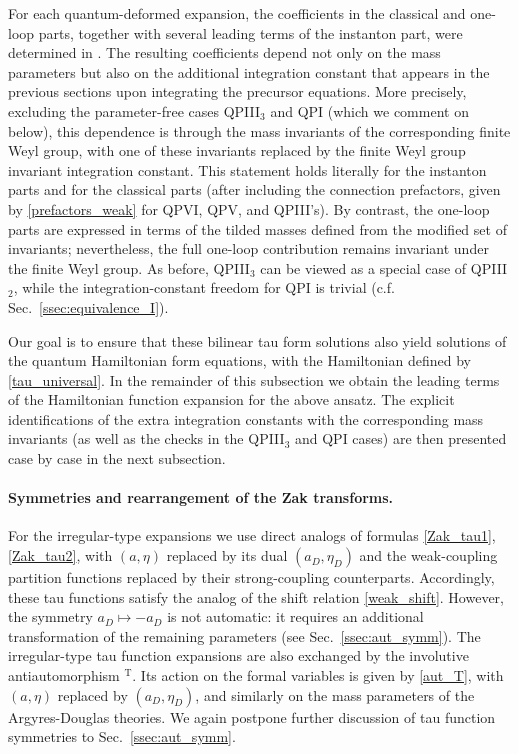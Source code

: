 \documentclass[12pt,a4paper]{article}
\numberwithin{equation}{section}
\newcommand{\D}{\scriptscriptstyle{D}}
\begin{document}
For each quantum-deformed expansion, the coefficients in the classical and one-loop parts, together with several leading terms of the instanton part, were determined in \cite[Sec.~4]{BST25}. The resulting coefficients depend not only on the mass parameters but also on the additional integration constant that appears in the previous sections upon integrating the precursor equations. More precisely, excluding the parameter-free cases QPIII$_3$ and QPI (which we comment on below), this dependence is through the mass invariants of the corresponding finite Weyl group, with one of these invariants replaced by the finite Weyl group invariant integration constant. This statement holds literally for the instanton parts and for the classical parts (after including the connection prefactors, given by \eqref{prefactors_weak} for QPVI, QPV, and QPIII's). By contrast, the one-loop parts are expressed in terms of the tilded masses defined from the modified set of invariants; nevertheless, the full one-loop contribution remains invariant under the finite Weyl group. As before, QPIII$_3$ can be viewed as a special case of QPIII$_2$, while the integration-constant freedom for QPI is trivial (c.f. Sec.~\ref{ssec:equivalence_I}).
 
Our goal is to ensure that these bilinear tau form solutions also yield solutions of the quantum Hamiltonian form equations, with the Hamiltonian defined by \eqref{tau_universal}. In the remainder of this subsection we obtain the leading terms of the Hamiltonian function expansion for the above ansatz. The explicit identifications of the extra integration constants with the corresponding mass invariants (as well as the checks in the QPIII$_3$ and QPI cases) are then presented case by case in the next subsection.

\paragraph{Symmetries and rearrangement of the Zak transforms.}
For the irregular-type expansions we use direct analogs of formulas \eqref{Zak_tau1}, \eqref{Zak_tau2}, with $(a,\eta)$ replaced by its dual $(a_{\D},\eta_{\D})$ and the weak-coupling partition functions replaced by their strong-coupling counterparts. Accordingly, these tau functions satisfy the analog of the shift relation
\eqref{weak_shift}. However, the symmetry $a_{\D}\mapsto-a_{\D}$ is not automatic: it requires an additional transformation of the remaining parameters  (see Sec.~\ref{ssec:aut_symm}). 
The irregular-type tau function expansions are also  exchanged by the involutive antiautomorphism $^\mathrm{T}$. Its action on the formal variables is given by \eqref{aut_T}, with $(a,\eta)$ replaced by $(a_{\D},\eta_{\D})$, and similarly on the mass parameters of the Argyres-Douglas theories. We again postpone further discussion of tau function symmetries to Sec.~\ref{ssec:aut_symm}.
\end{document}
